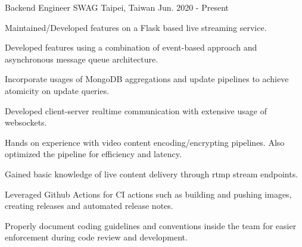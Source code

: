 

\begin{cventries}

  \cventry
    {Backend Engineer} %
    {SWAG} %
    {Taipei, Taiwan} %
    {Jun. 2020 - Present} %
    {
      \begin{cvitems} %
        \item {Maintained/Developed features on a Flask based live streaming service. }
        \item {Developed features using a combination of event-based approach and asynchronous message queue architecture. }
        \item {Incorporate usages of MongoDB aggregations and update pipelines to achieve atomicity on update queries. }
        \item {Developed client-server realtime communication with extensive usage of websockets. }
        \item {Hands on experience with video content encoding/encrypting pipelines. Also optimized the pipeline for efficiency and latency. }
        \item {Gained basic knowledge of live content delivery through rtmp stream endpoints.}
        \item {Leveraged Github Actions for CI actions such as building and pushing images, creating releases and automated release notes.}
        \item {Properly document coding guidelines and conventions inside the team for easier enforcement during code review and development. }
      \end{cvitems}
    }


\end{cventries}
